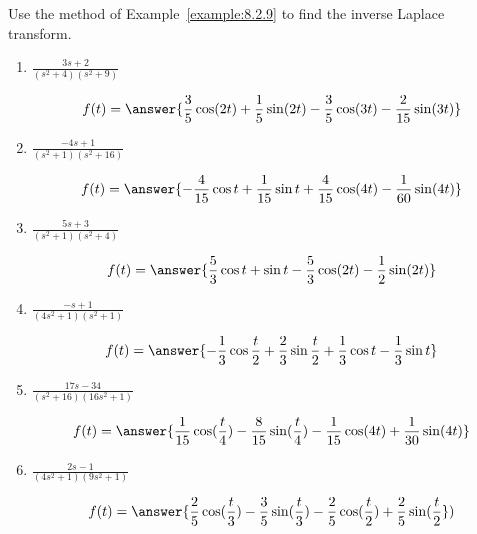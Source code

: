 \documentclass{ximera}
\begin{document}
\begin{problem}\label{exer:8.2.5}
 Use the method of Example~\ref{example:8.2.9}  to find the
inverse Laplace transform.

\begin{enumerate}
    \item $\frac{3s+2}{(s^2+4)(s^2+9)}$

$$f(t)=\answer{\frac{3}{5}\cos(2t)+\frac{1}{5}\sin(2t)-\frac{3}{5}\cos(3t)-\frac{2}{15}\sin(3t)}$$
    
    \item $\frac{-4s+1}{(s^2+1)(s^2+16)}$
    
$$f(t)=\answer{-\frac{4}{15}\cos{t}+\frac{1}{15}\sin{t}+\frac{4}{15}\cos(4t)-\frac{1}{60}\sin(4t)}$$
    
    \item $\frac{5s+3}{(s^2+1)(s^2+4)}$

$$f(t)=\answer{\frac{5}{3}\cos{t}+\sin{t}-\frac{5}{3}\cos(2t)-\frac{1}{2}\sin(2t)}$$
    
    \item $\frac{-s+1}{(4s^2+1)(s^2+1)}$

$$f(t)=\answer{-\frac{1}{3}\cos{\frac{t}{2}}+\frac{2}{3}\sin{\frac{t}{2}}+\frac{1}{3}\cos{t}-\frac{1}{3}\sin{t}}$$
    
    \item $\frac{17s-34}{(s^2+16)(16s^2+1)}$

$$f(t)=\answer{\frac{1}{15}\cos(\frac{t}{4})-\frac{8}{15}\sin(\frac{t}{4})-\frac{1}{15}\cos(4t)+\frac{1}{30}\sin(4t)}$$
    
    \item $\frac{2s-1}{(4s^2+1)(9s^2+1)}$

$$f(t)=\answer{\frac{2}{5}\cos(\frac{t}{3})-\frac{3}{5}\sin(\frac{t}{3})-\frac{2}{5}\cos(\frac{t}{2})+\frac{2}{5}\sin(\frac{t}{2}})$$
    
\end{enumerate}
\end{problem}
\end{document}

